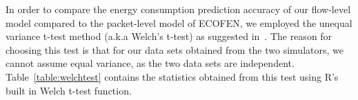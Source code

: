 In order to compare the energy consumption prediction accuracy of our flow-level model compared to the packet-level model of ECOFEN, we employed the unequal variance t-test method (a.k.a Welch's t-test) as suggested in~\cite{ruxton2006unequal}. The reason for choosing this test is that for our data sets obtained from the two simulators, we cannot assume equal variance, as the two data sets are independent. Table~\ref{table:welchtest} contains the statistics obtained from this test using R's built in Welch t-test function. 

\begin{figure}[ht]
	\centering
\centering
	
\centering


\end{figure}
